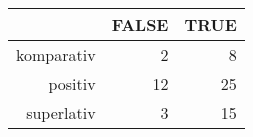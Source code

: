 \begin{tabular}{rrr}
  \hline
 & FALSE & TRUE \\ 
  \hline
komparativ & 2 & 8 \\ 
  positiv & 12 & 25 \\ 
  superlativ & 3 & 15 \\ 
   \hline
\end{tabular}
